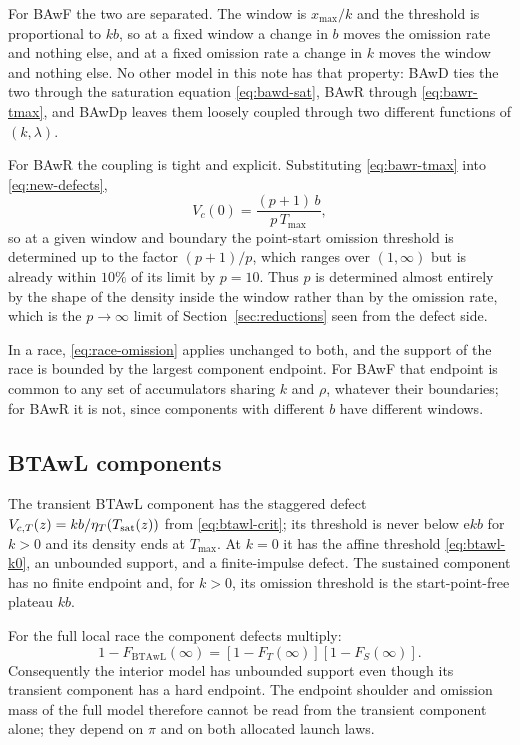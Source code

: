 \documentclass[12pt]{article}
\newcommand{\e}{\mathrm{e}}
\theoremstyle{remark}
\begin{document}
For BAwF the two are separated. The window is $x_{\max}/k$ and the threshold is proportional to $kb$, so at a fixed window a change in $b$ moves the omission rate and nothing else, and at a fixed omission rate a change in $k$ moves the window and nothing else. No other model in this note has that property: BAwD ties the two through the saturation equation
\eqref{eq:bawd-sat}, BAwR through \eqref{eq:bawr-tmax}, and BAwDp leaves them
loosely coupled through two different functions of $(k,\lambda)$.

For BAwR the coupling is tight and explicit. Substituting
\eqref{eq:bawr-tmax} into \eqref{eq:new-defects},
\begin{equation}
  V_c(0) = \frac{(p+1)\,b}{p\,T_{\max}},
  \label{eq:bawr-defect-window}
\end{equation}
so at a given window and boundary the point-start omission threshold is determined up to the factor $(p+1)/p$, which ranges over $(1,\infty)$ but is
already within $10\%$ of its limit by $p=10$. Thus $p$ is determined almost
entirely by the shape of the density inside the window rather than by the omission rate, which is the $p\to\infty$ limit of Section~\ref{sec:reductions} seen from the defect side.

In a race, \eqref{eq:race-omission} applies unchanged to both, and the support of the race is bounded by the largest component endpoint. For BAwF that endpoint is common to any set of accumulators sharing $k$ and $\rho$, whatever their boundaries; for BAwR it is not, since components with different $b$ have different windows.

\subsection{BTAwL components}
The transient BTAwL component has the staggered defect $V_{c,T}(z)=kb/\eta_T(T_{\rm sat}(z))$ from \eqref{eq:btawl-crit}; its threshold is never below $\e kb$ for $k>0$ and its density ends at $T_{\max}$.  At $k=0$ it has the affine threshold
\eqref{eq:btawl-k0}, an unbounded support, and a finite-impulse defect.
The sustained component has no finite endpoint and, for $k>0$, its omission threshold is the start-point-free plateau $kb$.

For the full local race the component defects multiply:
\[
  1-F_{\mathrm{BTAwL}}(\infty)
  =[1-F_T(\infty)][1-F_S(\infty)].
\]
Consequently the interior model has unbounded support even though its transient component has a hard endpoint.  The endpoint shoulder and omission mass of the full model therefore cannot be read from the transient component alone; they depend on $\pi$ and on both allocated launch laws.
\end{document}
